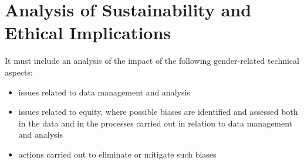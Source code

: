 \section{Analysis of Sustainability and Ethical Implications}

It must include an analysis of the impact of the following gender-related technical aspects:
\begin{itemize}
    \item issues related to data management and analysis
    \item issues related to equity, where possible biases are identified and assessed both in the data and in the processes carried out in relation to data management and analysis
    \item actions carried out to eliminate or mitigate such biases
\end{itemize}